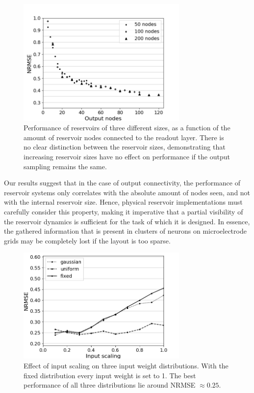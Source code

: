 \begin{figure}[H]
  \centering
  \includegraphics[width=3.3in]{img/output_nodes.png}
  \caption{
    Performance of reservoirs of three different sizes, as a function of the
amount of reservoir nodes connected to the readout layer. There is no clear
distinction between the reservoir sizes, demonstrating that increasing reservoir
sizes have no effect on performance if the output sampling remains the same.
  }
  \label{output_nodes}
\end{figure}

Our results suggest that in the case of output connectivity, the performance of
reservoir systems only correlates with the absolute amount of nodes seen, and
not with the internal reservoir size. Hence, physical reservoir implementations
must carefully consider this property, making it imperative that a partial
visibility of the reservoir dynamics is sufficient for the task of which it is
designed. In essence, the gathered information that is present in clusters of
neurons on microelectrode grids may be completely lost if the layout is too
sparse.


\begin{figure}[H]
  \centering
  \includegraphics[width=3.3in]{img/input_scaling_distrib.png}
  \caption{
    Effect of input scaling on three input weight distributions. With the fixed
distribution every input weight is set to 1. The best performance of all three
distributions lie around NRMSE $\approx 0.25$.
  }
  \label{input_scaling_distrib}
\end{figure}

